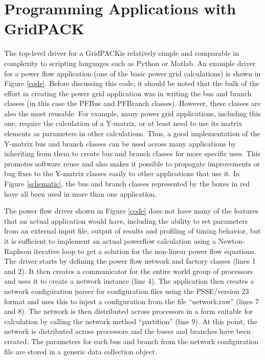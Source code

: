\documentclass[preprint]{acm_proc_article-sp}
\begin{document}
\section{Programming Applications with GridPACK\texttrademark}
The top-level driver for a GridPACK\texttrademark is relatively simple and
comparable in complexity to scripting languages such as Python or Matlab. An
example driver for a power flow application (one of the basic power grid
calculations) is shown in Figure \ref{code}. Before discussing this code, it
should be noted that the bulk of the effort in creating the power grid application
was in writing the bus and branch classes (in this case the PFBus and PFBranch
classes). However, these classes are also the most reusable. For example, many
power grid applications, including this one, require the calculation of a
Y-matrix, or at least need to use its matrix elements as parameters in other
calculations. Thus, a good implementation of the Y-matrix bus and branch classes
can be used across many applications by inheriting from them to create
bus and branch classes for more specific uses. This promotes software reuse and
also makes it possible to propagate improvements or bug fixes to the Y-matrix
classes easily to other applications that use it. In Figure \ref{schematic}, the
bus and branch classes represented by the boxes in red have all been used in
more than one application.

The power flow driver shown in Figure \ref{code} does not have many of the
features that an actual application would have, including the ability to set
parameters
from an external input file, output of results and profiling of timing behavior,
but it is sufficient to implement an actual powerflow calculation using
a Newton-Raphson iterative loop to get a solution for the non-linear power flow
equations. The driver starts by defining the power
flow network and factory classes (lines 1 and 2). It then creates a communicator
for the entire world group of processors and uses it to create a network
instance (line 4). The application then creates a network configuration parser
for configuration files using the PSSE/version 23 format and uses this to injest
a configuration from the file ``network.raw'' (lines 7 and 8). The network is then
distributed across processors in a form suitable for calculation by calling the
network method ``partition'' (line 9). At this point, the network is distributed
across processors and the buses and branches have been created. The parameters for each
bus and branch from the network configuration file are stored in a generic data
collection object.
\end{document}
